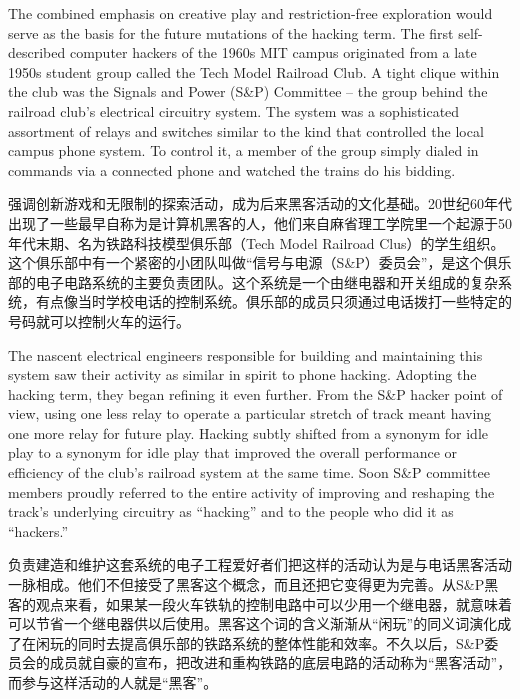 \ifdefined\eng
The combined emphasis on creative play and restriction-free exploration would serve as the basis for the future mutations of the hacking term. The first self-described computer hackers of the 1960s MIT campus originated from a late 1950s student group called the Tech Model Railroad Club. A tight clique within the club was the Signals and Power (S\&P) Committee -- the group behind the railroad club's electrical circuitry system. The system was a sophisticated assortment of relays and switches similar to the kind that controlled the local campus phone system. To control it, a member of the group simply dialed in commands via a connected phone and watched the trains do his bidding.
\fi

\ifdefined\chs
强调创新游戏和无限制的探索活动，成为后来黑客活动的文化基础。20世纪60年代出现了一些最早自称为是计算机黑客的人，他们来自麻省理工学院里一个起源于50年代末期、名为铁路科技模型俱乐部（Tech Model Railroad Clus）的学生组织。这个俱乐部中有一个紧密的小团队叫做``信号与电源（S\&P）委员会''，是这个俱乐部的电子电路系统的主要负责团队。这个系统是一个由继电器和开关组成的复杂系统，有点像当时学校电话的控制系统。俱乐部的成员只须通过电话拨打一些特定的号码就可以控制火车的运行。
\fi

\ifdefined\eng
The nascent electrical engineers responsible for building and maintaining this system saw their activity as similar in spirit to phone hacking. Adopting the hacking term, they began refining it even further. From the S\&P hacker point of view, using one less relay to operate a particular stretch of track meant having one more relay for future play. Hacking subtly shifted from a synonym for idle play to a synonym for idle play that improved the overall performance or efficiency of the club's railroad system at the same time. Soon S\&P committee members proudly referred to the entire activity of improving and reshaping the track's underlying circuitry as ``hacking'' and to the people who did it as ``hackers.''
\fi

\ifdefined\chs
负责建造和维护这套系统的电子工程爱好者们把这样的活动认为是与电话黑客活动一脉相成。他们不但接受了黑客这个概念，而且还把它变得更为完善。从S\&P黑客的观点来看，如果某一段火车铁轨的控制电路中可以少用一个继电器，就意味着可以节省一个继电器供以后使用。黑客这个词的含义渐渐从``闲玩''的同义词演化成了在闲玩的同时去提高俱乐部的铁路系统的整体性能和效率。不久以后，S\&P委员会的成员就自豪的宣布，把改进和重构铁路的底层电路的活动称为``黑客活动''，而参与这样活动的人就是``黑客''。
\fi

